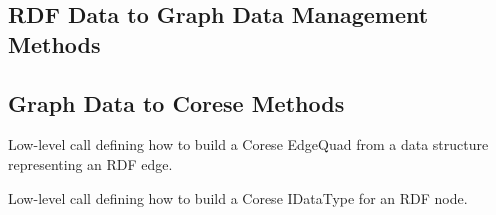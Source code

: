 \documentclass[12pt,a4paper]{memoir} %
\begin{document}
\subsection{RDF Data to Graph Data Management Methods}
\begin{description}[align=left]
\item[createRelationShip(s,o,p,properties)]
\item[getNode]
\item[createOrGetNode]
\end{description}

\subsection{Graph Data to Corese Methods}
\begin{description}[align=left]
\item[buildEdge] Low-level call defining how to build a Corese EdgeQuad from a data structure representing an RDF edge.
\item[buildNode] Low-level call defining how to build a Corese IDataType for an RDF node.

\end{description}
\end{document}
